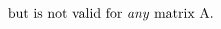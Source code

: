 \documentclass[preview]{standalone}
\begin{document}
\begin{align*}
\text{but is not valid for \textit{any} matrix A.}
\end{align*}
\end{document}
